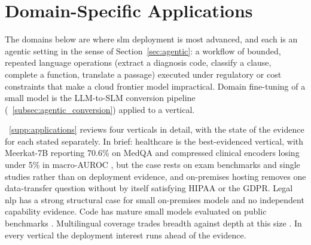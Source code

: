 
\section{Domain-Specific Applications}
\label{sec:applications}

The domains below are where \gls{slm} deployment is most advanced, and each is an
agentic setting in the sense of Section~\ref{sec:agentic}: a workflow of bounded,
repeated language operations (extract a diagnosis code, classify a clause,
complete a function, translate a passage) executed under regulatory or cost
constraints that make a cloud frontier model impractical. Domain fine-tuning of a
small model is the LLM-to-SLM conversion pipeline
(\suppsec~\ref{subsec:agentic_conversion}) applied to a vertical.

\suppsec~\ref{supp:applications} reviews four verticals in detail, with the state of the evidence for each stated separately. In brief: healthcare is the best-evidenced vertical, with Meerkat-7B reporting 70.6\% on MedQA \citep{kim2025meerkat} and compressed clinical encoders losing under 5\% in macro-AUROC \citep{hasan2024optimclm}, but the case rests on exam benchmarks and single studies rather than on deployment evidence, and on-premises hosting removes one data-transfer question without by itself satisfying HIPAA or the GDPR. Legal \gls{nlp} has a strong structural case for small on-premises models and no independent capability evidence. Code has mature small models evaluated on public benchmarks \citep{roziere2023codellama,lozhkov2024starcoder2,zhu2024deepseek_coder}. Multilingual coverage trades breadth against depth at this size \citep{ustun2024aya,aryabumi2024aya23}. In every vertical the deployment interest runs ahead of the evidence.
